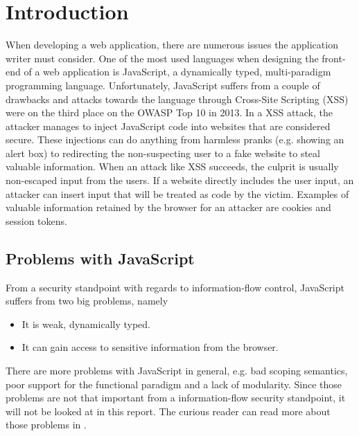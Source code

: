 \chapter{Introduction}
\label{chapter:intro}
When developing a web application, there are numerous issues the application writer must consider. One of the most used languages when designing the front-end of a web application is JavaScript\cite{javascript_popularity}, a dynamically typed, multi-paradigm programming language.\cite{javascript_info} Unfortunately, JavaScript suffers from a couple of drawbacks and attacks towards the language through Cross-Site Scripting (XSS) were on the third place on the OWASP Top 10 in 2013.\cite{owasp_xss_rank} In a XSS attack, the attacker manages to inject JavaScript code into websites that are considered secure.\cite{owasp_xss, excess_xss} These injections can do anything from harmless pranks (e.g. showing an alert box) to redirecting the non-suspecting user to a fake website to steal valuable information. When an attack like XSS succeeds, the culprit is usually non-escaped input from the users. If a website directly includes the user input, an attacker can insert input that will be treated as code by the victim.\cite{excess_xss} Examples of valuable information retained by the browser for an attacker are cookies and session tokens.
\section{Problems with JavaScript}
From a security standpoint with regards to information-flow control, JavaScript suffers from two big problems, namely
\begin{itemize}
  \item It is weak, dynamically typed.
  \item It can gain access to sensitive information from the browser.
\end{itemize}
There are more problems with JavaScript in general, e.g. bad scoping semantics, poor support for the functional paradigm and a lack of modularity. Since those problems are not that important from a information-flow security standpoint, it will not be looked at in this report. The curious reader can read more about those problems in \cite{haste-lang}.


